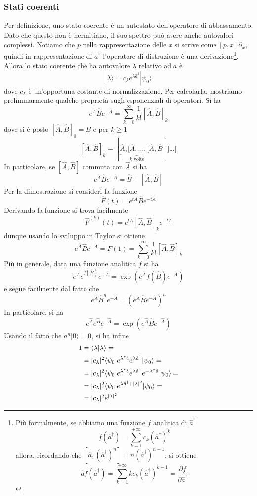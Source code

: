 \documentclass[a4paper, 11pt]{article}
\renewcommand{\ket}[1]{| #1\rangle}
\begin{document}
\subsubsection{Stati coerenti}
Per definizione, uno stato coerente è un autostato dell'operatore di abbassamento. Dato che questo non è hermitiano, il suo spettro può avere anche autovalori complessi. Notiamo che $p$ nella rappresentazione delle $x$ si scrive come $[p,x]\partial_x$, quindi in rappresentazione di $a^\dagger$ l'operatore di distruzione è una derivazione\footnote{Più formalmente, se abbiamo una funzione $f$ analitica di $\hat a^\dagger$
	\[f(\hat a^\dagger)=\sum_{k=1}^{+\infty}c_k(\hat a^\dagger)^k\] allora, ricordando che $[\hat a,(\hat a^\dagger)^n]=n(\hat a^\dagger)^{n-1}$, si ottiene
	\[\hat {a}f(\hat {a}^\dagger)=\sum_{k=1}^{+\infty}kc_k(\hat {a}^\dagger)^{k-1}=\frac{\partial f}{\partial \hat{a}^\dagger}\]}. Allora lo stato coerente che ha autovalore $\lambda$ relativo ad $a$ è
\[\ket\lambda=c_\lambda e^{\lambda \hat a^\dagger}\ket{\psi_0}\]
dove $c_\lambda$ è un'opportuna costante di normalizzazione. Per calcolarla, mostriamo preliminarmente qualche proprietà sugli esponenziali di operatori. Si ha
\[e^{\hat A}\hat Be^{-\hat A}=\sum_{k=0}^{\infty}\frac{1}{k!}[\hat A,\hat B]_k\]
dove si è posto $[\hat A,\hat B]_0=B$ e per $k\geq1$
\[[\hat A,\hat B]_k=[\underbrace{\hat A,[\hat A,\dots,[\hat A}_{k\textrm{ volte}},\hat B]]\dots]\]
In particolare, se $[\hat A,\hat B]$ commuta con $\hat A$ si ha
\[e^{\hat A}\hat Be^{-\hat A}=\hat B+[\hat A,\hat B]\]
Per la dimostrazione si consideri la funzione
\[\hat F(t)=e^{t\hat A}\hat Be^{-t\hat A}\]
Derivando la funzione si trova facilmente
\[{\hat F}^{(k)}(t)=e^{t\hat A}[\hat A,\hat B]_ke^{-t\hat A}\]
dunque usando lo sviluppo in Taylor si ottiene
\[e^{\hat A}\hat Be^{-\hat A}=F(1)=\sum_{k=0}^{\infty}\frac{1}{k!}[\hat A,\hat B]_k\]
Più in generale, data una funzione analitica $f$ si ha
\[e^{\hat A}e^{f(\hat B)}e^{-\hat A}=\exp\left(e^{\hat A}f(\hat B)e^{-\hat A}\right)\]
e segue facilmente dal fatto che
\[e^{\hat A}\hat B^ne^{-\hat A}=\left(e^{\hat A}\hat Be^{-\hat A}\right)^n\]
In particolare, si ha
\[e^{\hat A}e^{\hat B}e^{-\hat A}=\exp\left(e^{\hat A}\hat Be^{-\hat A}\right)\]
Usando il fatto che $a^n\ket 0=0$, si ha infine
\begin{align*}
1&=\langle \lambda\vert\lambda\rangle=\\&=|c_\lambda|^2\langle\psi_0|e^{\lambda^*\hat a}e^{\lambda \hat a^\dagger}|\psi_0\rangle=\\&=|c_\lambda|^2\langle\psi_0|e^{\lambda^*\hat a}e^{\lambda \hat a^\dagger}e^{-\lambda^*\hat a}|\psi_0\rangle=\\&=|c_\lambda|^2\langle\psi_0|e^{\lambda \hat a^\dagger+|\lambda|^2}|\psi_0\rangle=\\&=|c_\lambda|^2e^{|\lambda|^2}
\end{align*}
\end{document}
